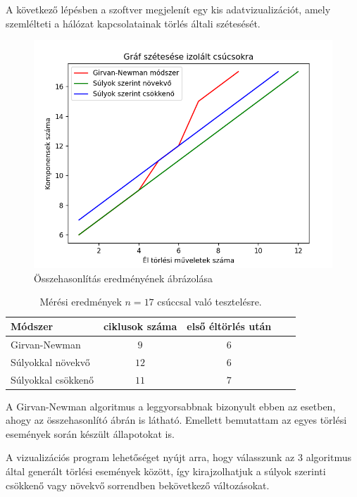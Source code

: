 A következő lépésben a szoftver megjelenít egy kis adatvizualizációt, amely szemlélteti a hálózat kapcsolatainak törlés általi szétesését.
\begin{figure}[h]
    \centering
    \includegraphics[scale=0.7]{images/hasonlitas}
    \caption{Összehasonlítás eredményének ábrázolása}
    \label{fig:enter-label}
\end{figure}


\begin{table}[h]
	\centering
	\begin{tabular}{ | l | c | c | c | c |}
		\hline 
		\textbf{Módszer} & \textbf{ciklusok száma} & \textbf{első éltörlés után}  \\
		\hline
		Girvan-Newman & $ 9 $ & $ 6 $  \\
		\hline
		Súlyokkal növekvő & $ 12 $ & $ 6 $ \\
		\hline
		Súlyokkal csökkenő & $ 11 $ & $ 7 $  \\
		\hline
		
	\end{tabular}
	\caption{Mérési eredmények  $ n = 17 $ csúccsal való tesztelésre.}
	\label{tablazat1}
\end{table}

A Girvan-Newman algoritmus a leggyorsabbnak bizonyult ebben az esetben, ahogy az összehasonlító ábrán is látható. Emellett bemutattam az egyes törlési események során készült állapotokat is.

A vizualizációs program lehetőséget nyújt arra, hogy válasszunk az 3 algoritmus által generált törlési események között, így kirajzolhatjuk a súlyok szerinti csökkenő vagy növekvő sorrendben bekövetkező változásokat.


